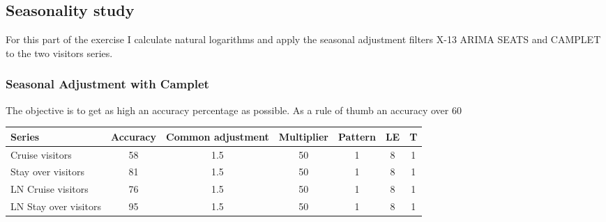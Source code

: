 \documentclass[11pt]{article}
\begin{document}
\newpage
\subsection{Seasonality study}
For this part of the exercise I calculate natural logarithms and apply the seasonal adjustment filters X-13 ARIMA SEATS and CAMPLET to the two visitors series.

\subsubsection{Seasonal Adjustment with Camplet}
The objective is to get as high an accuracy percentage as possible. As a rule of thumb an accuracy over 60%

\begin{table}[H]
\centering
{} \label{tab:title} 
\begin{tabular}{ l| c|c|c|c|c|c }
\toprule[1.25pt]
Series & Accuracy & Common adjustment & Multiplier & Pattern & LE & T \\
\midrule
Cruise visitors & 58 & 1.5 & 50 & 1 & 8 & 1 \\
Stay over visitors & 81 & 	1.5 & 50 & 1 & 8 & 1 \\
LN Cruise visitors & 76 & 	1.5 & 50 & 1 & 8 & 1 \\
LN Stay over visitors & 95 & 	1.5 & 50 & 1 & 8 & 1\\
\bottomrule[1.25pt]
\end{tabular}
\par
\end{table}
\end{document}
